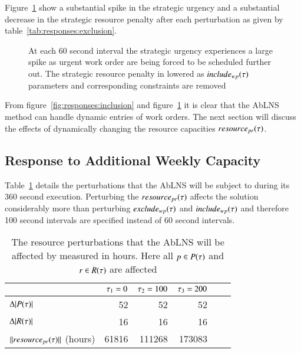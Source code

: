 Figure~\ref{fig:responses:exclusion}  show a substantial spike in the strategic urgency
and a substantial decrease in the strategic resource penalty   
after each perturbation as given by table~\ref{tab:responses:exclusion}. 

\begin{figure}[H]
	\centering
	\resizebox{10cm}{!}{
		
	}
	\caption{At each 60 second interval the strategic urgency experiences a 
		large spike as urgent work order are being forced to be scheduled further out.
		The strategic resource penalty in lowered as $include_{wp}(\tau)$ parameters
		and corresponding constraints are removed 
	}\label{fig:responses:exclusion}
\end{figure}

From figure~\ref{fig:responses:inclusion} and figure~\ref{fig:responses:exclusion} it is 
clear that the AbLNS method can handle dynamic entries of work orders. The next section will discuss the effects of dynamically changing the 
resource capacities $\ParStrategicResource$. 

\subsection{Response to Additional Weekly Capacity}\label{sec:increase_week_cap}
Table~\ref{tab:responses:resource-addition} details the perturbations that the
AbLNS will be subject to during its 360 second execution. Perturbing the
$\ParStrategicResource$ affects the solution considerably more than
perturbing $exclude_{wp}(\tau)$ and $include_{wp}(\tau)$ and therefore 100
second intervals are specified instead of 60 second intervals.

\begin{table}[H]
	\centering
	\begin{tabular}{lrrrrr}
	\toprule
	                                     & $\tau_1 = 0$ & $\tau_2 = 100$ & $\tau_3 = 200$   \\ \midrule
	$\Delta |P(\tau)|$                & 52                     & 52                     & 52                     \\ \midrule
	$\Delta |R(\tau)|$              & 16                     & 16                     & 16                     \\ \midrule
	$ ||resource_{pr}(\tau)||$ (hours) &  61816                 & 111268                 & 173083                 \\ \bottomrule
	\end{tabular}
	\caption{The resource perturbations that the AbLNS will be affected by measured in hours.
		Here all $p \in P(\tau)$ and $r \in R(\tau)$ are 
		affected
	}\label{tab:responses:resource-addition}
\end{table}

